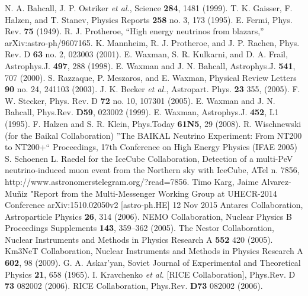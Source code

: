 \begin{thebibliography}{1}
 N. A. Bahcall, J. P. Ostriker {\it et al.}, Science \textbf{284}, 1481 (1999).
  T. K. Gaisser, F. Halzen, and T. Stanev, Physics Reports \textbf{258} no. 3, 173 (1995).
 E. Fermi, Phys. Rev. \textbf{75} (1949).
 R. J. Protheroe, “High energy neutrinos from blazars,” arXiv:astro-ph/9607165.
  K. Mannheim, R. J. Protheroe, and J. P. Rachen,  Phys. Rev. D \textbf{63} no. 2, 023003 (2001).
 E. Waxman, S. R. Kulkarni, and D. A. Frail,  Astrophys.J. \textbf{497}, 288 (1998).
 E. Waxman and J. N. Bahcall, Astrophys.J. \textbf{541}, 707 (2000).
 S. Razzaque, P. Meszaros, and E. Waxman, Physical Review Letters \textbf{90} no. 24, 241103 (2003).
  J. K. Becker {\it et al.}, Astropart. Phys. \textbf{23} 355, (2005).
 F. W. Stecker, Phys. Rev. D \textbf{72} no. 10,  107301 (2005).
 E. Waxman and J. N. Bahcall, Phys.Rev. \textbf{D59},  023002 (1999).
  E. Waxman,  Astrophys.J. \textbf{452},  L1 (1995).
 F. Halzen and S. R. Klein, Phys.Today \textbf{61N5}, 29 (2008).
 R. Wischnewski (for the Baikal Collaboration) ''The BAIKAL Neutrino Experiment: From NT200 to NT200+`` Proceedings, 17th Conference on High Energy Physics (IFAE 2005)
 S. Schoenen L. Raedel for the IceCube Collaboration, Detection of a multi-PeV neutrino-induced muon event from the Northern sky with IceCube, ATel n. 7856, http://www.astronomerstelegram.org/?read=7856.
 Timo Karg, Jaime Alvarez-Mu\~niz "Report from the Multi-Messenger Working Group at UHECR-2014 Conference arXiv:1510.02050v2 [astro-ph.HE] 12 Nov 2015
 Antares Collaboration, Astroparticle Physics \textbf{26}, 314 (2006).
 NEMO Collaboration, Nuclear Physics B Proceedings Supplements \textbf{143},  359–362 (2005).
  The Nestor Collaboration,  Nuclear Instruments and Methods in Physics Research A \textbf{552} 420 (2005).
  Km3NeT Collaboration, Nuclear Instruments and Methods in Physics Research A \textbf{602}, 98 (2009).
  G. A. Askar’yan, Soviet Journal of Experimental and Theoretical Physics \textbf{21}, 658 (1965).
 I. Kravchenko {\it et al.} [RICE Collaboration], Phys.Rev. D \textbf{73} 082002 (2006).
 RICE Collaboration, Phys.Rev. \textbf{D73}  082002 (2006).

\end{thebibliography}
